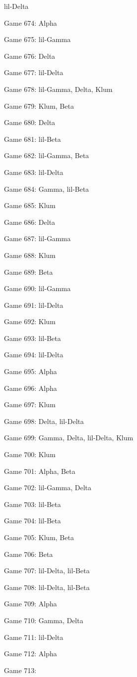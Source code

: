 \documentclass{article}
\begin{document}
\begin{multicols}{3}
\begin{compactitem}
lil-Delta
\item Game 674:
Alpha
\item Game 675:
lil-Gamma
\item Game 676:
Delta
\item Game 677:
lil-Delta
\item Game 678:
lil-Gamma, Delta, Klum
\item Game 679:
Klum, Beta
\item Game 680:
Delta
\item Game 681:
lil-Beta
\item Game 682:
lil-Gamma, Beta
\item Game 683:
lil-Delta
\item Game 684:
Gamma, lil-Beta
\item Game 685:
Klum
\item Game 686:
Delta
\item Game 687:
lil-Gamma
\item Game 688:
Klum
\item Game 689:
Beta
\item Game 690:
lil-Gamma
\item Game 691:
lil-Delta
\item Game 692:
Klum
\item Game 693:
lil-Beta
\item Game 694:
lil-Delta
\item Game 695:
Alpha
\item Game 696:
Alpha
\item Game 697:
Klum
\item Game 698:
Delta, lil-Delta
\item Game 699:
Gamma, Delta, lil-Delta, Klum
\item Game 700:
Klum
\item Game 701:
Alpha, Beta
\item Game 702:
lil-Gamma, Delta
\item Game 703:
lil-Beta
\item Game 704:
lil-Beta
\item Game 705:
Klum, Beta
\item Game 706:
Beta
\item Game 707:
lil-Delta, lil-Beta
\item Game 708:
lil-Delta, lil-Beta
\item Game 709:
Alpha
\item Game 710:
Gamma, Delta
\item Game 711:
lil-Delta
\item Game 712:
Alpha
\item Game 713:

\end{compactitem}
\end{multicols}
\end{document}
